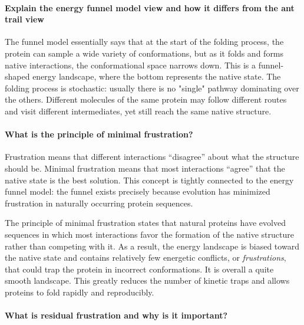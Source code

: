 \paragraph{Explain the energy funnel model view and how it differs from the ant trail view}
The funnel model essentially says that at the start of the folding process, the protein can sample a wide variety of conformations, but as it folds and forms native interactions, the conformational space narrows down. 
This is a funnel-shaped energy landscape, where the bottom represents the native state. The folding process is stochastic: usually there is no "single" pathway dominating over the others.
Different molecules of the same protein may follow different routes and visit different intermediates, yet still reach the same native structure.



\paragraph{What is the principle of minimal frustration?}

Frustration means that different interactions “disagree” about what the structure should be. Minimal frustration means that most interactions “agree” that the native state is the best solution.
This concept is tightly connected to the energy funnel model: the funnel exists precisely because evolution has minimized frustration in naturally occurring protein sequences.


The principle of minimal frustration states that natural proteins have evolved sequences in which most interactions favor the formation of the native structure rather than competing with it. As a result, the energy landscape is biased toward the native state and contains relatively few energetic conflicts, or \emph{frustrations}, that could trap the protein in incorrect conformations. It is
overall a quite smooth landscape. This greatly reduces the number of kinetic traps and allows proteins to fold rapidly and reproducibly.


\paragraph{What is residual frustration and why is it important?}

